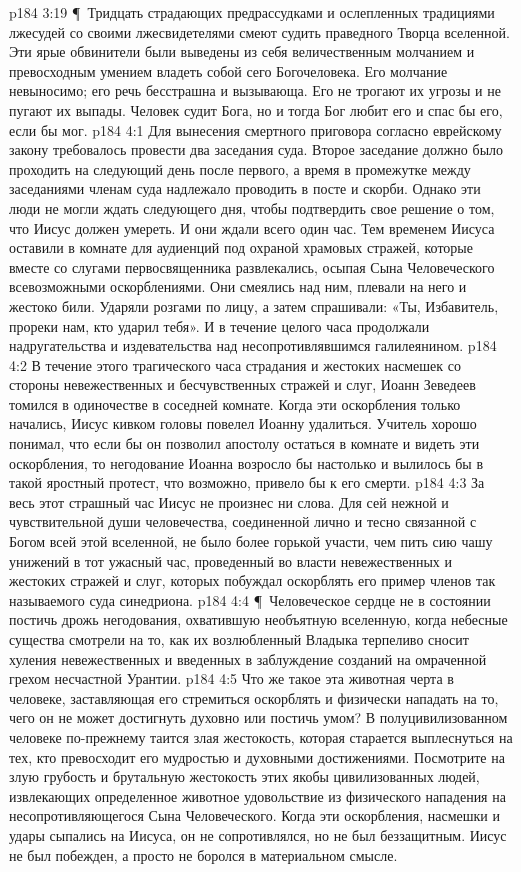 \vs p184 3:19 \P\ Тридцать страдающих предрассудками и ослепленных традициями лжесудей со своими лжесвидетелями смеют судить праведного Творца вселенной. Эти ярые обвинители были выведены из себя величественным молчанием и превосходным умением владеть собой сего Богочеловека. Его молчание невыносимо; его речь бесстрашна и вызывающа. Его не трогают их угрозы и не пугают их выпады. Человек судит Бога, но и тогда Бог любит его и спас бы его, если бы мог.
\vs p184 4:1 Для вынесения смертного приговора согласно еврейскому закону требовалось провести два заседания суда. Второе заседание должно было проходить на следующий день после первого, а время в промежутке между заседаниями членам суда надлежало проводить в посте и скорби. Однако эти люди не могли ждать следующего дня, чтобы подтвердить свое решение о том, что Иисус должен умереть. И они ждали всего один час. Тем временем Иисуса оставили в комнате для аудиенций под охраной храмовых стражей, которые вместе со слугами первосвященника развлекались, осыпая Сына Человеческого всевозможными оскорблениями. Они смеялись над ним, плевали на него и жестоко били. Ударяли розгами по лицу, а затем спрашивали: «Ты, Избавитель, прореки нам, кто ударил тебя». И в течение целого часа продолжали надругательства и издевательства над несопротивлявшимся галилеянином.
\vs p184 4:2 В течение этого трагического часа страдания и жестоких насмешек со стороны невежественных и бесчувственных стражей и слуг, Иоанн Зеведеев томился в одиночестве в соседней комнате. Когда эти оскорбления только начались, Иисус кивком головы повелел Иоанну удалиться. Учитель хорошо понимал, что если бы он позволил апостолу остаться в комнате и видеть эти оскорбления, то негодование Иоанна возросло бы настолько и вылилось бы в такой яростный протест, что возможно, привело бы к его смерти.
\vs p184 4:3 За весь этот страшный час Иисус не произнес ни слова. Для сей нежной и чувствительной души человечества, соединенной лично и тесно связанной с Богом всей этой вселенной, не было более горькой участи, чем пить сию чашу унижений в тот ужасный час, проведенный во власти невежественных и жестоких стражей и слуг, которых побуждал оскорблять его пример членов так называемого суда синедриона.
\vs p184 4:4 \P\ Человеческое сердце не в состоянии постичь дрожь негодования, охватившую необъятную вселенную, когда небесные существа смотрели на то, как их возлюбленный Владыка терпеливо сносит хуления невежественных и введенных в заблуждение созданий на омраченной грехом несчастной Урантии.
\vs p184 4:5 Что же такое эта животная черта в человеке, заставляющая его стремиться оскорблять и физически нападать на то, чего он не может достигнуть духовно или постичь умом? В полуцивилизованном человеке по\hyp{}прежнему таится злая жестокость, которая старается выплеснуться на тех, кто превосходит его мудростью и духовными достижениями. Посмотрите на злую грубость и брутальную жестокость этих якобы цивилизованных людей, извлекающих определенное животное удовольствие из физического нападения на несопротивляющегося Сына Человеческого. Когда эти оскорбления, насмешки и удары сыпались на Иисуса, он не сопротивлялся, но не был беззащитным. Иисус не был побежден, а просто не боролся в материальном смысле.
